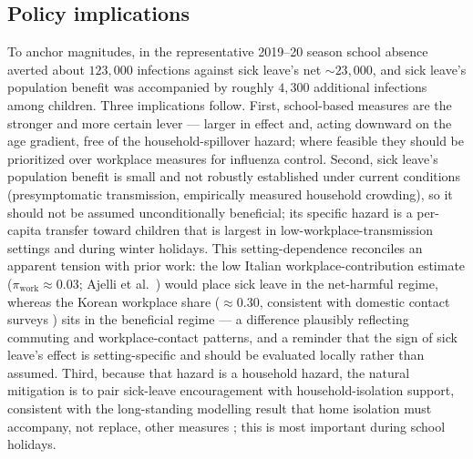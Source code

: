 \documentclass[12pt]{article}
\theoremstyle{plain}
\theoremstyle{remark}
\theoremstyle{definition}
\begin{document}
\subsection{Policy implications}
To anchor magnitudes, in the representative 2019--20 season school absence averted about $123{,}000$ infections against sick leave's net $\sim$$23{,}000$, and sick leave's population benefit was accompanied by roughly $4{,}300$ additional infections among children. Three implications follow. First, school-based measures are the stronger and more certain lever --- larger in effect and, acting downward on the age gradient, free of the household-spillover hazard; where feasible they should be prioritized over workplace measures for influenza control. Second, sick leave's population benefit is small and not robustly established under current conditions (presymptomatic transmission, empirically measured household crowding), so it should not be assumed unconditionally beneficial; its specific hazard is a per-capita transfer toward children that is largest in low-workplace-transmission settings and during winter holidays. This setting-dependence reconciles an apparent tension with prior work: the low Italian workplace-contribution estimate ($\pi_{\mathrm{work}}\approx0.03$; Ajelli et al.\ \cite{Ajelli2014}) would place sick leave in the net-harmful regime, whereas the Korean workplace share ($\approx0.30$, consistent with domestic contact surveys \cite{Son2025}) sits in the beneficial regime --- a difference plausibly reflecting commuting and workplace-contact patterns, and a reminder that the sign of sick leave's effect is setting-specific and should be evaluated locally rather than assumed. Third, because that hazard is a household hazard, the natural mitigation is to pair sick-leave encouragement with household-isolation support, consistent with the long-standing modelling result that home isolation must accompany, not replace, other measures \cite{Halloran2008,Davey2008}; this is most important during school holidays.
\end{document}

